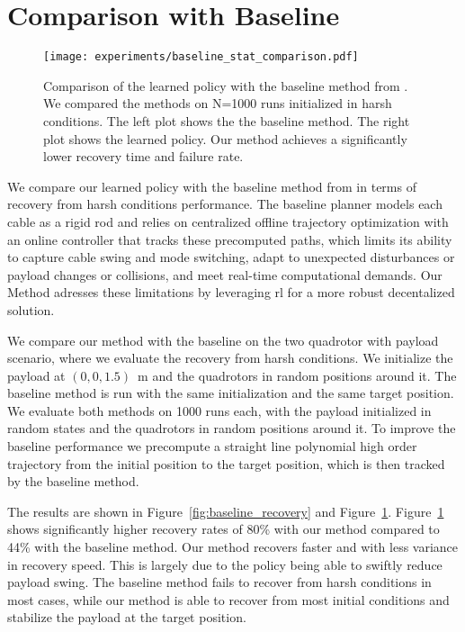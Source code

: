 \section{Comparison with Baseline}
\begin{figure}[H]
    \centering
    
    \texttt{[image: experiments/baseline\_stat\_comparison.pdf]}
    \caption[Baseline vs \gls{rl} Performance]{Comparison of the learned policy with the baseline method from \autocite{Wahba2024}. We compared the methods on N=1000 runs initialized in harsh conditions. The left plot shows the the baseline method. The right plot shows the learned policy. Our method achieves a significantly lower recovery time and failure rate.}
    \label{fig:baseline_histogram_comparison}

\end{figure}
We compare our learned policy with the baseline method from \autocite{Wahba2024} in terms of recovery from harsh conditions performance. The baseline planner models each cable as a rigid rod and relies on centralized offline trajectory optimization with an online controller that tracks these precomputed paths, which limits its ability to capture cable swing and mode switching, adapt to unexpected disturbances or payload changes or collisions, and meet real-time computational demands. Our Method adresses these limitations by leveraging \gls{rl} for a more robust decentalized solution.

We compare our method with the baseline on the two quadrotor with payload scenario, where we evaluate the recovery from harsh conditions. We initialize the payload at $(0,0,1.5)$~m and the quadrotors in random positions around it. The baseline method is run with the same initialization and the same target position. We evaluate both methods on 1000 runs each, with the payload initialized in random states and the quadrotors in random positions around it. To improve the baseline performance we precompute a straight line polynomial high order trajectory from the initial position to the target position, which is then tracked by the baseline method.

The results are shown in Figure~\ref{fig:baseline_recovery} and Figure~\ref{fig:baseline_histogram_comparison}.
Figure~\ref{fig:baseline_histogram_comparison} shows significantly higher recovery rates of 80\% with our method compared to 44\% with the baseline method. Our method recovers faster and with less variance in recovery speed. This is largely due to the policy being able to swiftly reduce payload swing. The baseline method fails to recover from harsh conditions in most cases, while our method is able to recover from most initial conditions and stabilize the payload at the target position.


